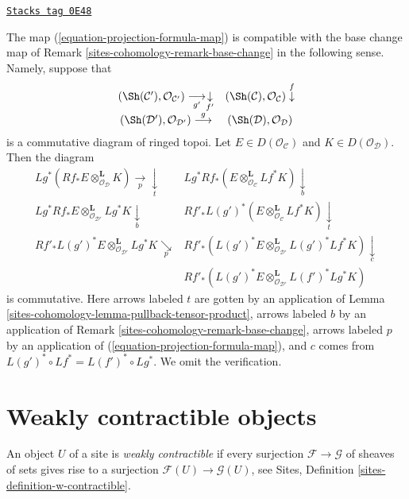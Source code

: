 \begin{remark}
\label{sites-cohomology-remark-compatible-with-diagram}
\href{https://stacks.math.columbia.edu/tag/0E48}{\texttt{Stacks tag 0E48}}

The map (\ref{equation-projection-formula-map}) is compatible with the
base change map of Remark \ref{sites-cohomology-remark-base-change} in the following sense.
Namely, suppose that
$$
\begin{array}{cc}(\Sh(\mathcal{C}'), \mathcal{O}_{\mathcal{C}'})
\underset{g'}{\longrightarrow}\underset{f'}{\downarrow} & (\Sh(\mathcal{C}), \mathcal{O}_\mathcal{C}) \overset{f}{\downarrow} \\ (\Sh(\mathcal{D}'), \mathcal{O}_{\mathcal{D}'})
\overset{g}{\longrightarrow} & (\Sh(\mathcal{D}), \mathcal{O}_\mathcal{D})\end{array}
$$
is a commutative diagram of ringed topoi.
Let $E \in D(\mathcal{O}_\mathcal{C})$ and $K \in D(\mathcal{O}_\mathcal{D})$.
Then the diagram
$$
\begin{array}{cc}Lg^*(Rf_*E \otimes^\mathbf{L}_{\mathcal{O}_\mathcal{D}} K)
\underset{p}{\longrightarrow}\underset{t}{\downarrow} & Lg^*Rf_*(E \otimes^\mathbf{L}_{\mathcal{O}_\mathcal{C}} Lf^*K)
\underset{b}{\downarrow} \\ Lg^*Rf_*E \otimes^\mathbf{L}_{\mathcal{O}_{\mathcal{D}'}}
Lg^*K \underset{b}{\downarrow} & Rf'_*L(g')^*(E \otimes^\mathbf{L}_{\mathcal{O}_\mathcal{C}}
Lf^*K) \underset{t}{\downarrow} \\ Rf'_*L(g')^*E \otimes^\mathbf{L}_{\mathcal{O}_{\mathcal{D}'}}
Lg^*K \underset{p}{\searrow} & Rf'_*(L(g')^*E \otimes^\mathbf{L}_{\mathcal{O}_{\mathcal{D}'}}
L(g')^*Lf^*K) \underset{c}{\downarrow} \\  & Rf'_*(L(g')^*E \otimes^\mathbf{L}_{\mathcal{O}_{\mathcal{D}'}}
L(f')^*Lg^*K)\end{array}
$$
is commutative. Here arrows labeled $t$ are gotten by an application of
Lemma \ref{sites-cohomology-lemma-pullback-tensor-product}, arrows labeled $b$ by an
application of Remark \ref{sites-cohomology-remark-base-change}, arrows labeled $p$
by an application of (\ref{equation-projection-formula-map}), and
$c$ comes from $L(g')^* \circ Lf^* = L(f')^* \circ Lg^*$.
We omit the verification.
\end{remark}

\section{Weakly contractible objects}
\label{sites-cohomology-section-w-contractible}
An object $U$ of a site is {\it weakly contractible} if every surjection
$\mathcal{F} \to \mathcal{G}$ of sheaves of sets gives rise to a surjection
$\mathcal{F}(U) \to \mathcal{G}(U)$, see
Sites, Definition \ref{sites-definition-w-contractible}.

